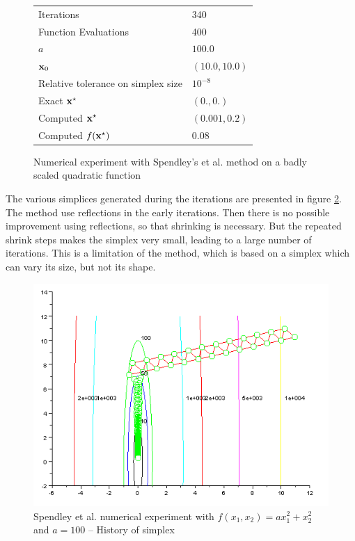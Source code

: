 \begin{figure}[h]
\begin{center}
\begin{tabular}{|l|l|}
\hline
Iterations & 340 \\
Function Evaluations & 400 \\
$a$ & $100.0$ \\
$\mathbf{x}_0$ & $(10.0,10.0)$ \\
Relative tolerance on simplex size & $10^{-8}$ \\
Exact $\mathbf{x}^\star$ & $(0.,0.)$\\
Computed $\mathbf{x}^\star$ & $(0.001,0.2)$\\
Computed $f(\mathbf{x}^\star)$ & $0.08$\\
\hline
\end{tabular}
\end{center}
\caption{Numerical experiment with Spendley's et al. method on a badly scaled quadratic function}
\label{fig-spendley-numexp2-table}
\end{figure}

The various simplices generated during the iterations are 
presented in figure \ref{fig-spendley-numexp2-historysimplex}.
The method use reflections in the early iterations. Then there
is no possible improvement using reflections, so that shrinking is necessary.
But the repeated shrink steps makes the simplex very small, leading to a large number of 
iterations. This is a limitation of the method, which is based on a simplex 
which can vary its size, but not its shape.

\begin{figure}
\begin{center}
\includegraphics[width=15cm]{quad2-spendley-simplexcontours.png}
\end{center}
\caption{Spendley et al. numerical experiment with $f(x_1,x_2) = a x_1^2 + x_2^2$ and $a=100$ -- History of simplex}
\label{fig-spendley-numexp2-historysimplex}
\end{figure}

